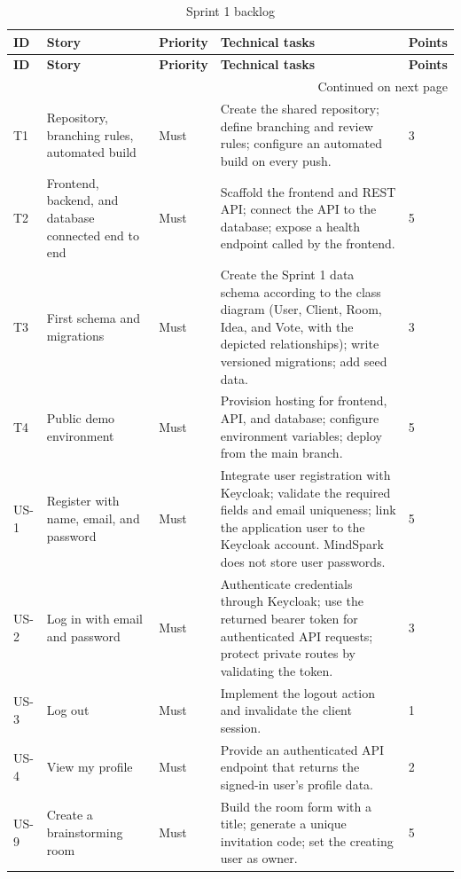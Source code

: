 \documentclass[12pt,a4paper]{report}
\renewcommand{\arraystretch}{1.18}
\begin{document}
\begingroup
\small
\renewcommand{\arraystretch}{1.35}
\setlength{\tabcolsep}{8pt}
\begin{longtable}{@{}p{}p{}p{}p{}p{}@{}}
\caption{Sprint 1 backlog}\label{tab:sprint1-backlog}\\
\toprule
\textbf{ID} & \textbf{Story} & \textbf{Priority} & \textbf{Technical tasks} & \textbf{Points} \\
\midrule
\endfirsthead
\toprule
\textbf{ID} & \textbf{Story} & \textbf{Priority} & \textbf{Technical tasks} & \textbf{Points} \\
\midrule
\endhead
\midrule
\multicolumn{5}{r}{Continued on next page}\\
\endfoot
\bottomrule
\endlastfoot
T1 & Repository, branching rules, automated build & Must & Create the shared repository; define branching and review rules; configure an automated build on every push. & 3 \\
T2 & Frontend, backend, and database connected end to end & Must & Scaffold the frontend and REST API; connect the API to the database; expose a health endpoint called by the frontend. & 5 \\
T3 & First schema and migrations & Must & Create the Sprint 1 data schema according to the class diagram (User, Client, Room, Idea, and Vote, with the depicted relationships); write versioned migrations; add seed data. & 3 \\
T4 & Public demo environment & Must & Provision hosting for frontend, API, and database; configure environment variables; deploy from the main branch. & 5 \\
US-1 & Register with name, email, and password & Must & Integrate user registration with Keycloak; validate the required fields and email uniqueness; link the application user to the Keycloak account. MindSpark does not store user passwords. & 5 \\
US-2 & Log in with email and password & Must & Authenticate credentials through Keycloak; use the returned bearer token for authenticated API requests; protect private routes by validating the token. & 3 \\
US-3 & Log out & Must & Implement the logout action and invalidate the client session. & 1 \\
US-4 & View my profile & Must & Provide an authenticated API endpoint that returns the signed-in user's profile data. & 2 \\
US-9 & Create a brainstorming room & Must & Build the room form with a title; generate a unique invitation code; set the creating user as owner. & 5 \\

\end{longtable}
\end{document}
